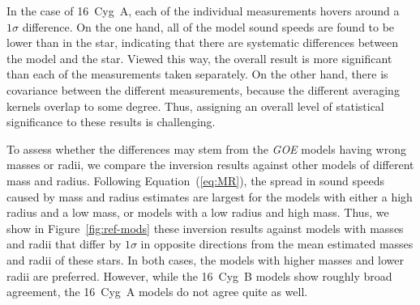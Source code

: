 In the case of 16~Cyg~A, each of the individual measurements hovers around a ${1\sigma}$ difference. 
On the one hand, all of the model sound speeds are found to be lower than in the star, indicating that there are systematic differences between the model and the star.
Viewed this way, the overall result is more significant than each of the measurements taken separately. 
On the other hand, there is covariance between the different measurements, because the different averaging kernels overlap to some degree. 
Thus, assigning an overall level of statistical significance to these results is challenging. 



To assess whether the differences may stem from the \emph{GOE} models having wrong masses or radii, we compare the inversion results against other models of different mass and radius. 
Following Equation~(\ref{eq:MR}), the spread in sound speeds caused by mass and radius estimates are largest for the models with either a high radius and a low mass, or models with a low radius and high mass. 
Thus, we show in Figure~\ref{fig:ref-mods} these inversion results against models with masses and radii that differ by ${1\sigma}$ in opposite directions from the mean estimated masses and radii of these stars. 
In both cases, the models with higher masses and lower radii are preferred. 
However, while the 16~Cyg~B models show roughly broad agreement, the 16~Cyg~A models do not agree quite as well. 



